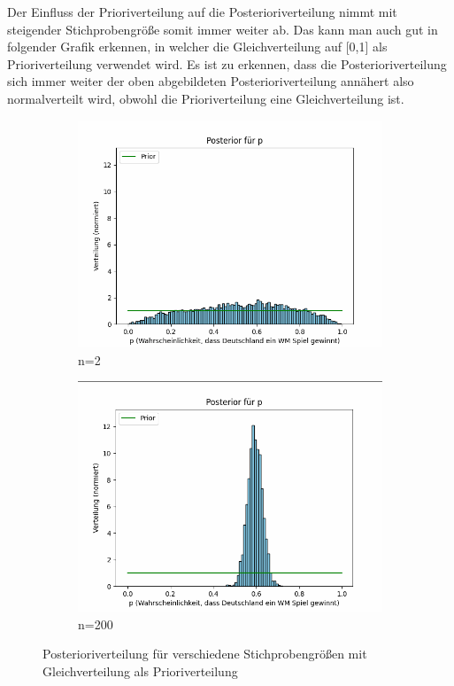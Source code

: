 \documentclass[a4paper,12pt]{article}
\begin{document}
\noindent Der Einfluss der Prioriverteilung auf die Posterioriverteilung nimmt mit steigender Stichprobengröße somit immer weiter ab. Das kann man auch gut in folgender Grafik erkennen, in welcher die Gleichverteilung auf [0,1] als Prioriverteilung verwendet wird. Es ist zu erkennen, dass die Posterioriverteilung sich immer weiter der oben abgebildeten Posterioriverteilung annähert also normalverteilt wird, obwohl die Prioriverteilung eine Gleichverteilung ist.
\newpage
\begin{figure}[h]
  \centering
  \begin{subfigure}[b]{0.45\textwidth}
      \includegraphics[width=\textwidth]{../images/framesAnimatedSampleSizeUniform/frame1.png}
      \caption{n=2}
      \label{fig:bild1}
  \end{subfigure}
  \hfill
  \begin{subfigure}[b]{0.45\textwidth}
      \includegraphics[width=\textwidth]{../images/framesAnimatedSampleSizeUniform/frame2.png}
      \caption{n=200}
      \label{fig:bild2}
  \end{subfigure}
  \caption{Posterioriverteilung für verschiedene Stichprobengrößen mit Gleichverteilung als Prioriverteilung}
\end{figure}
\end{document}
